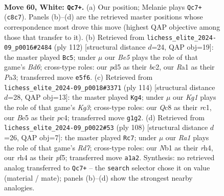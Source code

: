 \documentclass[11pt]{article}
\begin{document}
\clearpage

\begin{figure}[p]\centering
\begin{subfigure}{0.46\textwidth}\centering
\resizebox{\linewidth}{!}{%
\newchessgame
\chessboard[
  setfen={2Q5/8/1k6/p2pBp2/P6r/8/8/RN4K1 w - - 0 60},
  showmover=false,
  pgfstyle=straightmove, color=movearrow, markmove={c8-c7}
]}
\caption{}
\end{subfigure}\hfill
\begin{subfigure}{0.46\textwidth}\centering
\resizebox{\linewidth}{!}{%
\newchessgame
\chessboard[
  setfen={8/5k2/R2B1p2/3p4/p2P3r/P7/2b5/4K3 w - - 8 57},
  showmover=false,
  pgfstyle=straightmove, color=movearrow, markmove={d6-c5}
]}
\caption{}
\end{subfigure}
\\[4pt]
\begin{subfigure}{0.46\textwidth}\centering
\resizebox{\linewidth}{!}{%
\newchessgame
\chessboard[
  setfen={8/5p2/8/2k2B2/2p2P2/2P1R1K1/8/2r5 w - - 5 58},
  showmover=false,
  pgfstyle=straightmove, color=movearrow, markmove={g3-g4}
]}
\caption{}
\end{subfigure}\hfill
\begin{subfigure}{0.46\textwidth}\centering
\resizebox{\linewidth}{!}{%
\newchessgame
\chessboard[
  setfen={1r6/1P1R4/B1p5/P1k2p2/7r/5K2/8/8 w - - 0 55},
  showmover=false,
  pgfstyle=straightmove, color=movearrow, markmove={d7-c7}
]}
\caption{}
\end{subfigure}
\caption{\textbf{Move 60, White: \texttt{Qc7+}.} (a) Our position; Melanie plays \texttt{Qc7+} (\texttt{c8c7}). Panels (b)--(d) are the retrieved master positions whose correspondence most drove this move (highest QAP objective among those that transfer to it). (b) Retrieved from \texttt{lichess\_elite\_2024-09\_p0016\#2484} (ply 112) [structural distance $d$=24, QAP obj=19]: the master played \texttt{Bc5}; under $\mu$ our \emph{Be5} plays the role of that game's \emph{Bd6}; cross-type roles: our \emph{p}d5 as their \emph{b}c2, our \emph{R}a1 as their \emph{P}a3; transferred move \texttt{e5f6}. (c) Retrieved from \texttt{lichess\_elite\_2024-09\_p0018\#3371} (ply 114) [structural distance $d$=28, QAP obj=13]: the master played \texttt{Kg4}; under $\mu$ our \emph{Kg1} plays the role of that game's \emph{Kg3}; cross-type roles: our \emph{Q}c8 as their \emph{r}c1, our \emph{B}e5 as their \emph{p}c4; transferred move \texttt{g1g2}. (d) Retrieved from \texttt{lichess\_elite\_2024-09\_p0022\#53} (ply 108) [structural distance $d$=26, QAP obj=7]: the master played \texttt{Rc7}; under $\mu$ our \emph{Ra1} plays the role of that game's \emph{Rd7}; cross-type roles: our \emph{N}b1 as their \emph{r}h4, our \emph{r}h4 as their \emph{p}f5; transferred move \texttt{a1a2}. Synthesis: no retrieved analog transferred to \texttt{Qc7+} -- the \texttt{search} selector chose it on value (material / mate); panels (b)--(d) show the strongest nearby analogies.}
\label{fig:thought-m118}
\end{figure}
\end{document}
